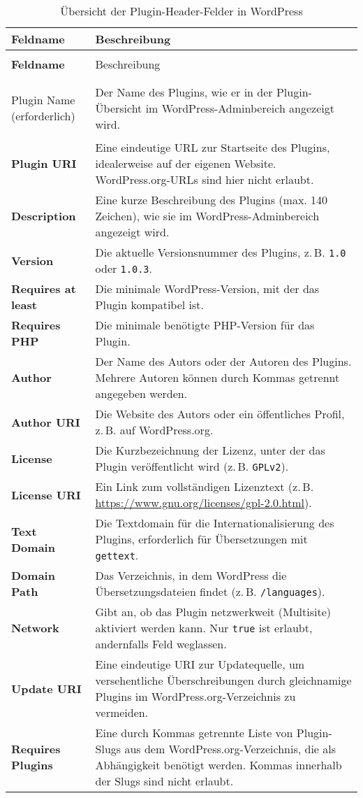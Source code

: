 \begin{longtable}{>{\bfseries}p{4cm} p{10cm}}
 \caption{Übersicht der Plugin-Header-Felder in WordPress} \\
 \hline
 Feldname & Beschreibung \\
 \hline
 \endfirsthead

 \multicolumn{2}{l}{\textit{Fortsetzung von vorheriger Seite}} \\
 \hline
 Feldname & Beschreibung \\
 \hline
 \endhead

 \hline
 \multicolumn{2}{r}{\textit{Fortsetzung auf nächster Seite}} \\
 \endfoot

 \hline
 \endlastfoot

 Plugin Name (erforderlich) & Der Name des Plugins, wie er in der Plugin-Übersicht im WordPress-Adminbereich angezeigt wird. \\
 Plugin URI & Eine eindeutige URL zur Startseite des Plugins, idealerweise auf der eigenen Website. WordPress.org-URLs sind hier nicht erlaubt. \\
 Description & Eine kurze Beschreibung des Plugins (max. 140 Zeichen), wie sie im WordPress-Adminbereich angezeigt wird. \\
 Version & Die aktuelle Versionsnummer des Plugins, z.\,B. \texttt{1.0} oder \texttt{1.0.3}. \\
 Requires at least & Die minimale WordPress-Version, mit der das Plugin kompatibel ist. \\
 Requires PHP & Die minimale benötigte PHP-Version für das Plugin. \\
 Author & Der Name des Autors oder der Autoren des Plugins. Mehrere Autoren können durch Kommas getrennt angegeben werden. \\
 Author URI & Die Website des Autors oder ein öffentliches Profil, z.\,B. auf WordPress.org. \\
 License & Die Kurzbezeichnung der Lizenz, unter der das Plugin veröffentlicht wird (z.\,B. \texttt{GPLv2}). \\
 License URI & Ein Link zum vollständigen Lizenztext (z.\,B. \url{https://www.gnu.org/licenses/gpl-2.0.html}). \\
 Text Domain & Die Textdomain für die Internationalisierung des Plugins, erforderlich für Übersetzungen mit \texttt{gettext}. \\
 Domain Path & Das Verzeichnis, in dem WordPress die Übersetzungsdateien findet (z.\,B. \texttt{/languages}). \\
 Network & Gibt an, ob das Plugin netzwerkweit (Multisite) aktiviert werden kann. Nur \texttt{true} ist erlaubt, andernfalls Feld weglassen. \\
 Update URI & Eine eindeutige URI zur Updatequelle, um versehentliche Überschreibungen durch gleichnamige Plugins im WordPress.org-Verzeichnis zu vermeiden. \\
 Requires Plugins & Eine durch Kommas getrennte Liste von Plugin-Slugs aus dem WordPress.org-Verzeichnis, die als Abhängigkeit benötigt werden. Kommas innerhalb der Slugs sind nicht erlaubt. \\
\end{longtable}

